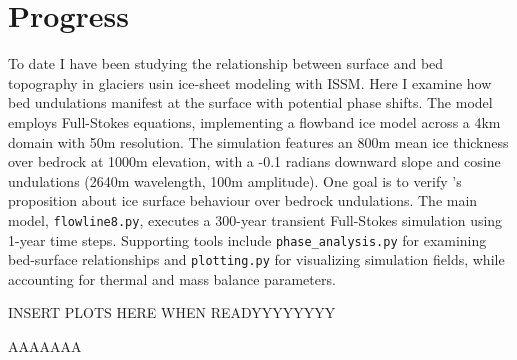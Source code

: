 \chapter{Progress}

To date I have been studying the relationship between surface and bed topography in glaciers usin ice-sheet modeling with ISSM. Here I examine how bed undulations manifest at the surface with potential phase shifts. The model employs Full-Stokes equations, implementing a flowband ice model across a 4km domain with 50m resolution. The simulation features an 800m mean ice thickness over bedrock at 1000m elevation, with a -0.1 radians downward slope and cosine undulations (2640m wavelength, 100m amplitude). One goal is to verify \cite{Budd_1970}'s proposition about ice surface behaviour over bedrock undulations. The main model, \texttt{flowline8.py}, executes a 300-year transient Full-Stokes simulation using 1-year time steps. Supporting tools include \texttt{phase\_analysis.py} for examining bed-surface relationships and \texttt{plotting.py} for visualizing simulation fields, while accounting for thermal and mass balance parameters.

\vspace{6cm}
INSERT PLOTS HERE WHEN READYYYYYYYY

AAAAAAA


